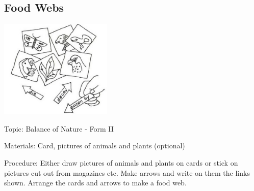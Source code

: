 \begin{multicols}{2}
\subsection{Food Webs} %

\begin{center}
\includegraphics[width=0.4\textwidth]{./img/vso/food-webs.jpg}
\end{center}

\begin{description*}
\item[Topic:]{Balance of Nature - Form II}
\item[Materials:]{Card, pictures of animals and plants (optional)}
\item[Procedure:]{Either draw pictures of animals
and plants on cards or stick on
pictures cut out from magazines
etc. Make arrows and write on
them the links shown. Arrange
the cards and arrows to make a
food web.}
\end{description*}


\end{multicols}
